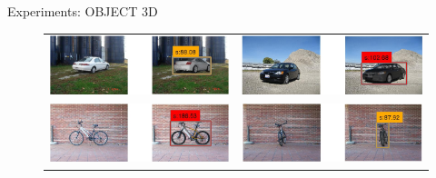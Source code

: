 \documentclass[serif,mathserif,final]{beamer}
\newcommand{\1}{\mathbb{I}} %
\begin{document}
\begin{frame}{}
\begin{columns}[t]
\begin{column}{0.3\linewidth}
      \begin{block}{Experiments: OBJECT 3D}
        \begin{figure}
          \begin{center}
          \setlength\tabcolsep{0pt}
          \begin{tabular}{c|c}
            \hline
            \includegraphics[width=0.40\linewidth]{supp/car32.png} &
            \includegraphics[width=0.40\linewidth]{supp/car26.png} \\
            \includegraphics[width=0.40\linewidth]{supp/bicycle16.png} &
            \includegraphics[width=0.40\linewidth]{supp/bicycle12.png} \\
            \hline
          \end{tabular}
          \end{center}
        \end{figure}


\end{block}
\end{column}
\end{columns}
\end{frame}
\end{document}
